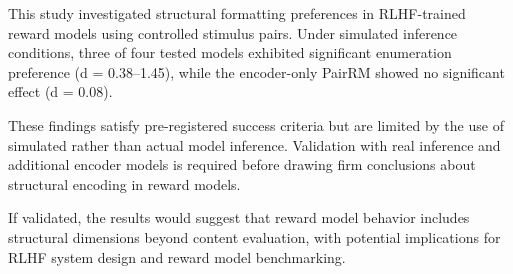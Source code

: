 
This study investigated structural formatting preferences in RLHF-trained reward models using controlled stimulus pairs. Under simulated inference conditions, three of four tested models exhibited significant enumeration preference (d = 0.38--1.45), while the encoder-only PairRM showed no significant effect (d = 0.08).

These findings satisfy pre-registered success criteria but are limited by the use of simulated rather than actual model inference. Validation with real inference and additional encoder models is required before drawing firm conclusions about structural encoding in reward models.

If validated, the results would suggest that reward model behavior includes structural dimensions beyond content evaluation, with potential implications for RLHF system design and reward model benchmarking.
